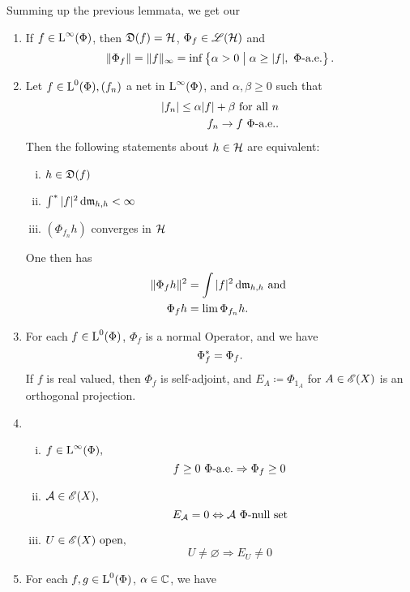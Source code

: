 Summing up the previous lemmata, we get our
\newpage
\begin{thrm} \label{maintheorem}
  \leavevmode
  \begin{enumerate}[\normalfont 1.]
   \item   

 If $f \in {\text{L}^\infty }(\Phi)$, then $\mathfrak{D}(f) = \mathcal{H}$, $ \Phi_f \in \mathscr{L}(\mathcal{H})$ and
 \[
 \| \Phi_f \| = \| f\|_\infty = \inf \left\lbrace \alpha > 0 \bigm | \alpha \geq |f|, ~\Phi\text{-a.e.}\right\rbrace.
 \]

 
\item 
Let $f \in {\text{L}^0}(\Phi), (f_n)$ a net in ${\text{L}^\infty}(\Phi)$, and $\alpha, \beta \geq 0$ such that
 \begin{align*}
   | f_n | \leq \alpha |f| + \beta \text{ for all } n \\
   f_n \to f ~\Phi\text{-a.e.}.
 \end{align*}
Then the following statements about $h \in \mathcal{H}$ are equivalent:
\begin{enumerate}[(i)]
 \item $h \in \mathfrak{D}(f)$
 \item $\int ^{*} | f| ^2 \operatorname{d}\! \mathfrak{m}_{h,h} < \infty$
 \item $(\Phi_{f_n}h)$ converges in $ \mathcal{H}$
\end{enumerate}
One then has
\begin{align*}
  \| \Phi_f h \| ^2 &= \int |f|^2 \operatorname{d}\! \mathfrak{m}_{h, h } \text{ and }\\
  \Phi_{f }h &= \lim \Phi_{f_n} h.
\end{align*}

\item
For each $f \in {\text{L}^0}(\Phi)$, $\Phi_f$ is a normal Operator, and we have
\[
 \Phi_f ^{*} = \Phi_f. 
\]
If $f$ is real valued, then $\Phi_f$ is self-adjoint, and $E_A \coloneqq 
\Phi_{1_A} $ for $ A \in \mathscr{E}(X)$ is an orthogonal projection. 
\item
\begin{enumerate}[(i)]
  \item $f \in {\text{L}^\infty }(\Phi),$ 
  \[
   f \geq 0 ~\Phi\text{-a.e.} \Rightarrow \Phi_f \geq 0
  \]

  \item $\mathcal{A} \in \mathscr{E}(X),$
  \[
  E_\mathcal{A} =0  \Leftrightarrow \mathcal{A} ~\Phi\text{-null set}
  \]
  \item $U \in \mathscr{E}(X)\text{ open,}$ 
  \[
   U \neq \varnothing \Rightarrow E_U \neq 0
  \]

 \end{enumerate}


\item 
For each $f, g \in {\text{L}^0}(\Phi)$, $\alpha \in \mathbb{C}$, we have


\end{enumerate}
\end{thrm}
